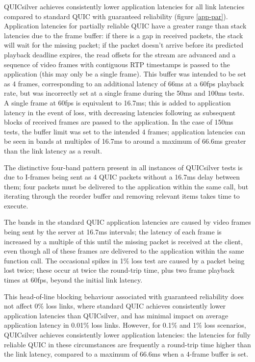 \documentclass{mpaper}
\begin{document}
QUICsilver achieves consistently lower application latencies for all link latencies compared to standard QUIC with guaranteed reliability (figure \ref{app-par}). Application latencies for partially reliable QUIC have a greater range than stack latencies due to the frame buffer: if there is a gap in received packets, the stack will wait for the missing packet; if the packet doesn't arrive before its predicted playback deadline expires, the read offsets for the stream are advanced and a sequence of video frames with contiguous RTP timestamps is passed to the application (this may only be a single frame). This buffer was intended to be set as 4 frames, corresponding to an additional latency of 66ms at a 60fps playback rate, but was incorrectly set at a single frame during the 50ms and 100ms tests. A single frame at 60fps is equivalent to 16.7ms; this is added to application latency in the event of loss, with decreasing latencies following as subsequent blocks of received frames are passed to the application. In the case of 150ms tests, the buffer limit was set to the intended 4 frames; application latencies can be seen in bands at multiples of 16.7ms to around a maximum of 66.6ms greater than the link latency as a result.


The distinctive four-band pattern present in all instances of QUICsilver tests is due to I-frames being sent as 4 QUIC packets without a 16.7ms delay between them; four packets must be delivered to the application within the same call, but iterating through the reorder buffer and removing relevant items takes time to execute.


The bands in the standard QUIC application latencies are caused by video frames being sent by the server at 16.7ms intervals; the latency of each frame is increased by a multiple of this until the missing packet is received at the client, even though all of these frames are delivered to the application within the same function call. The occasional spikes in 1\% loss test are caused by a packet being lost twice; these occur at twice the round-trip time, plus two frame playback times at 60fps, beyond the initial link latency.


This head-of-line blocking behaviour associated with guaranteed reliability does not affect 0\% loss links, where standard QUIC achieves consistently lower application latencies than QUICsilver, and has minimal impact on average application latency in 0.01\% loss links. However, for 0.1\% and 1\% loss scenarios, QUICsilver achieves consistently lower application latencies: the latencies for fully reliable QUIC in these circumstances are frequently a round-trip time higher than the link latency, compared to a maximum of 66.6ms when a 4-frame buffer is set.
\end{document}
